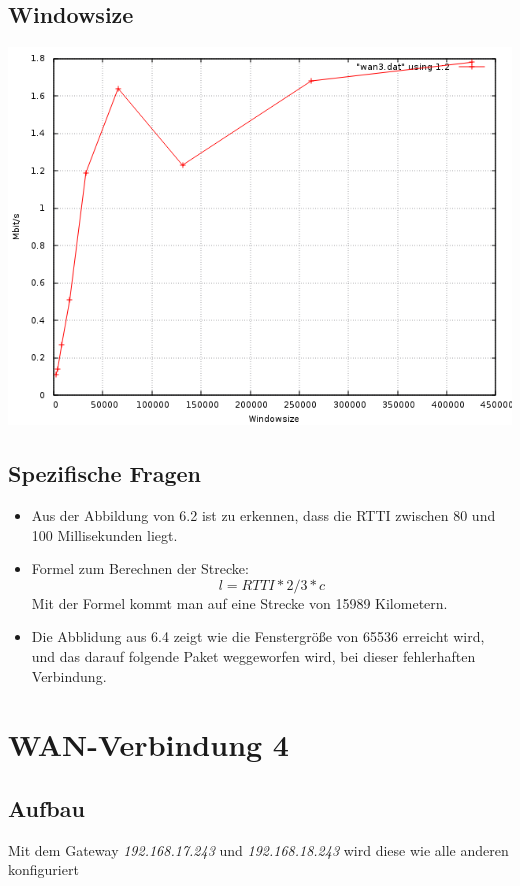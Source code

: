 \documentclass[a4paper,10pt]{article}
\begin{document}
\subsection{Windowsize}
\includegraphics[scale=0.75]{wan3_windows.png}

\subsection{Spezifische Fragen}
\begin{itemize}
 \item Aus der Abbildung von 6.2 ist zu erkennen, dass die RTTI zwischen 80 und 100 Millisekunden liegt.
 \item Formel zum Berechnen der Strecke: 
 \begin{equation}
  l=RTTI*2/3*c
 \end{equation}
 Mit der Formel kommt man auf eine Strecke von 15989 Kilometern.
 \item Die Abblidung aus  6.4 zeigt wie die Fenstergröße von 65536 erreicht wird, und das darauf folgende Paket
 weggeworfen wird, bei dieser fehlerhaften Verbindung.
\end{itemize}

\section{WAN-Verbindung 4}

\subsection{Aufbau}
Mit dem Gateway \textit{192.168.17.243} und \textit{192.168.18.243} wird diese wie alle anderen konfiguriert
\end{document}
